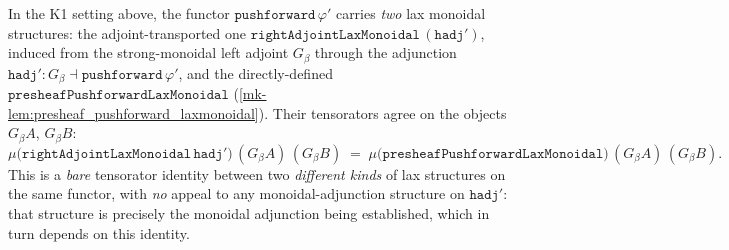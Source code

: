 \begin{lemma}\label{mk-lem:pushforward_lax_mu_comparison}
  \leanok

  In the K1 setting above, the functor \(\mathtt{pushforward}\,\varphi'\) carries \emph{two} lax
  monoidal structures: the adjoint-transported one
  \(\mathtt{rightAdjointLaxMonoidal}\,(\mathtt{hadj}')\), induced from the strong-monoidal left
  adjoint \(G_\beta\) through the adjunction \(\mathtt{hadj}' : G_\beta \dashv
  \mathtt{pushforward}\,\varphi'\), and the directly-defined
  \(\mathtt{presheafPushforwardLaxMonoidal}\) (\ref{mk-lem:presheaf_pushforward_laxmonoidal}). Their
  tensorators agree on the objects \(G_\beta A\), \(G_\beta B\):
  \[
    \mu\bigl(\mathtt{rightAdjointLaxMonoidal}\,\mathtt{hadj}'\bigr)\,(G_\beta A)\,(G_\beta B)
    \;=\;
    \mu\bigl(\mathtt{presheafPushforwardLaxMonoidal}\bigr)\,(G_\beta A)\,(G_\beta B).
  \]
  This is a \emph{bare} tensorator identity between two \emph{different kinds} of lax structures on
  the same functor, with \emph{no} appeal to any monoidal-adjunction structure on \(\mathtt{hadj}'\):
  that structure is precisely the monoidal adjunction being established, which in turn depends on
  this identity.
\end{lemma}
